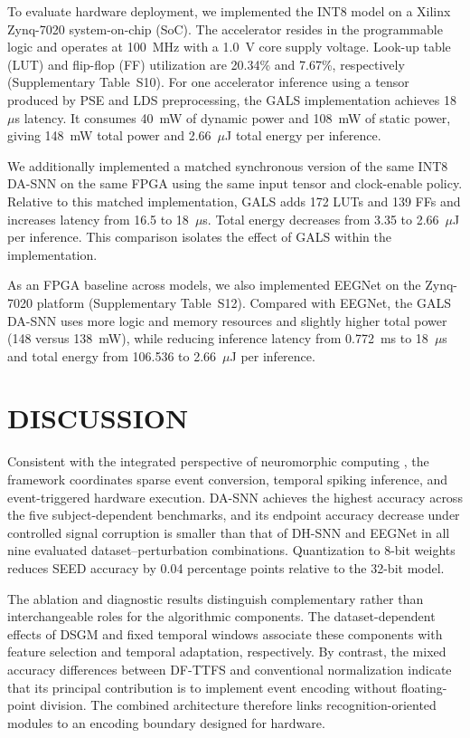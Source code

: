 ﻿\documentclass{nsr}
\begin{document}
To evaluate hardware deployment, we implemented the INT8 model on a Xilinx Zynq-7020 system-on-chip (SoC). The accelerator resides in the programmable logic and operates at 100~MHz with a 1.0~V core supply voltage. Look-up table (LUT) and flip-flop (FF) utilization are 20.34\% and 7.67\%, respectively (Supplementary Table~S10). For one accelerator inference using a tensor produced by PSE and LDS preprocessing, the GALS implementation achieves 18~$\mu$s latency. It consumes 40~mW of dynamic power and 108~mW of static power, giving 148~mW total power and 2.66~$\mu$J total energy per inference.

We additionally implemented a matched synchronous version of the same INT8 DA-SNN on the same FPGA using the same input tensor and clock-enable policy. Relative to this matched implementation, GALS adds 172 LUTs and 139 FFs and increases latency from 16.5 to 18~$\mu$s. Total energy decreases from 3.35 to 2.66~$\mu$J per inference. This comparison isolates the effect of GALS within the implementation.

As an FPGA baseline across models, we also implemented EEGNet on the Zynq-7020 platform (Supplementary Table~S12). Compared with EEGNet, the GALS DA-SNN uses more logic and memory resources and slightly higher total power (148 versus 138~mW), while reducing inference latency from 0.772~ms to 18~$\mu$s and total energy from 106.536 to 2.66~$\mu$J per inference.


\section{DISCUSSION}
Consistent with the integrated perspective of neuromorphic computing \cite{ref71}, the framework coordinates sparse event conversion, temporal spiking inference, and event-triggered hardware execution. DA-SNN achieves the highest accuracy across the five subject-dependent benchmarks, and its endpoint accuracy decrease under controlled signal corruption is smaller than that of DH-SNN and EEGNet in all nine evaluated dataset--perturbation combinations. Quantization to 8-bit weights reduces SEED accuracy by 0.04 percentage points relative to the 32-bit model.

The ablation and diagnostic results distinguish complementary rather than interchangeable roles for the algorithmic components. The dataset-dependent effects of DSGM and fixed temporal windows associate these components with feature selection and temporal adaptation, respectively. By contrast, the mixed accuracy differences between DF-TTFS and conventional normalization indicate that its principal contribution is to implement event encoding without floating-point division. The combined architecture therefore links recognition-oriented modules to an encoding boundary designed for hardware.
\end{document}
